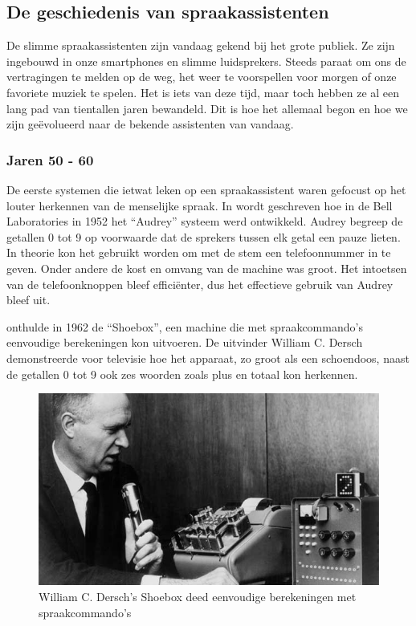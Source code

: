 \subsection{De geschiedenis van spraakassistenten}
De slimme spraakassistenten zijn vandaag gekend bij het grote publiek. Ze zijn ingebouwd in onze smartphones en slimme luidsprekers. Steeds paraat om ons de vertragingen te melden op de weg, het weer te voorspellen voor morgen of onze favoriete muziek te spelen. Het is iets van deze tijd, maar toch hebben ze al een lang pad van tientallen jaren bewandeld. Dit is hoe het allemaal begon en hoe we zijn geëvolueerd naar de bekende assistenten van vandaag.

\subsubsection{Jaren 50 - 60}
De eerste systemen die ietwat leken op een spraakassistent waren gefocust op het louter herkennen van de menselijke spraak. In \autocite{Vox-Creative2019} wordt geschreven hoe in  de Bell Laboratories in 1952 het ``Audrey'' systeem werd ontwikkeld. Audrey begreep de getallen 0 tot 9 op voorwaarde dat de sprekers tussen elk getal een pauze lieten. In theorie kon het gebruikt worden om met de stem een telefoonnummer in te geven. Onder andere de kost en omvang van de machine was groot. Het intoetsen van de telefoonknoppen bleef efficiënter, dus het effectieve gebruik van Audrey bleef uit.

\autocite{IBM2011} onthulde in 1962 de ``Shoebox'', een machine die met spraakcommando's eenvoudige berekeningen kon uitvoeren. De uitvinder William C. Dersch demonstreerde voor televisie hoe het apparaat, zo groot als een schoendoos, naast de getallen 0 tot 9 ook zes woorden zoals plus en totaal kon herkennen.

\begin{figure}[h]
    \includegraphics[width=0.7\linewidth]{img/Shoebox}
    \caption{William C. Dersch’s Shoebox deed eenvoudige berekeningen met spraakcommando's \autocite{IBM2011}}
    \label{fig:smartassist}
\end{figure}

